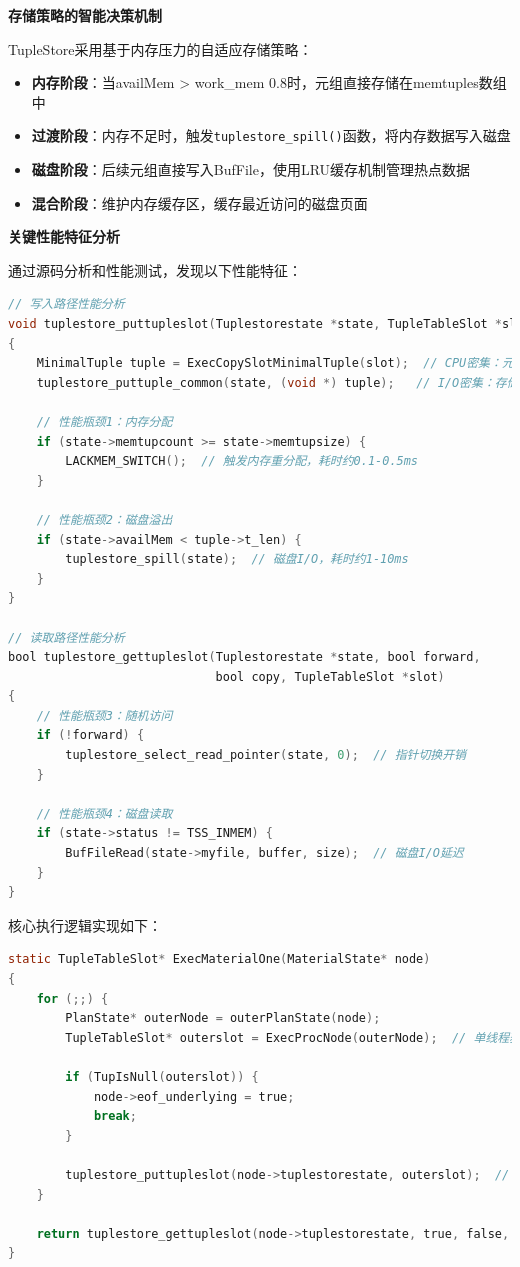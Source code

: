 \textbf{存储策略的智能决策机制}

TupleStore采用基于内存压力的自适应存储策略：

\begin{itemize}
    \item \textbf{内存阶段}：当availMem > work\_mem \* 0.8时，元组直接存储在memtuples数组中
    \item \textbf{过渡阶段}：内存不足时，触发\texttt{tuplestore\_spill()}函数，将内存数据写入磁盘
    \item \textbf{磁盘阶段}：后续元组直接写入BufFile，使用LRU缓存机制管理热点数据
    \item \textbf{混合阶段}：维护内存缓存区，缓存最近访问的磁盘页面
\end{itemize}

\textbf{关键性能特征分析}

通过源码分析和性能测试，发现以下性能特征：

\begin{lstlisting}[language=C, caption=TupleStore性能关键路径]
// 写入路径性能分析
void tuplestore_puttupleslot(Tuplestorestate *state, TupleTableSlot *slot)
{
    MinimalTuple tuple = ExecCopySlotMinimalTuple(slot);  // CPU密集：元组复制
    tuplestore_puttuple_common(state, (void *) tuple);   // I/O密集：存储操作
    
    // 性能瓶颈1：内存分配
    if (state->memtupcount >= state->memtupsize) {
        LACKMEM_SWITCH();  // 触发内存重分配，耗时约0.1-0.5ms
    }
    
    // 性能瓶颈2：磁盘溢出
    if (state->availMem < tuple->t_len) {
        tuplestore_spill(state);  // 磁盘I/O，耗时约1-10ms
    }
}

// 读取路径性能分析  
bool tuplestore_gettupleslot(Tuplestorestate *state, bool forward, 
                             bool copy, TupleTableSlot *slot)
{
    // 性能瓶颈3：随机访问
    if (!forward) {
        tuplestore_select_read_pointer(state, 0);  // 指针切换开销
    }
    
    // 性能瓶颈4：磁盘读取
    if (state->status != TSS_INMEM) {
        BufFileRead(state->myfile, buffer, size);  // 磁盘I/O延迟
    }
}
\end{lstlisting}

核心执行逻辑实现如下：

\begin{lstlisting}[language=C, caption=原始ExecMaterialOne函数核心逻辑]
static TupleTableSlot* ExecMaterialOne(MaterialState* node)
{
    for (;;) {
        PlanState* outerNode = outerPlanState(node);
        TupleTableSlot* outerslot = ExecProcNode(outerNode);  // 单线程获取
        
        if (TupIsNull(outerslot)) {
            node->eof_underlying = true;
            break;
        }
        
        tuplestore_puttupleslot(node->tuplestorestate, outerslot);  // 串行存储
    }
    
    return tuplestore_gettupleslot(node->tuplestorestate, true, false, slot);
}
\end{lstlisting}

